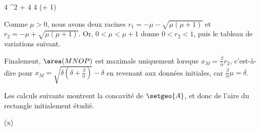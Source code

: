 \smallskip
\begin{stepcalc}[style=sar]
	\Delta
\explnext{}
	4 \mu^2 + 4 \mu
\explnext{}
	4 \mu (\mu + 1)
\end{stepcalc}
\smallskip

Comme $\mu > 0$, nous avons deux racines
$r_1 = - \mu - \sqrt{\mu (\mu + 1)}$
et
$r_2 = - \mu + \sqrt{\mu (\mu + 1)}$.
Or,
$0 < \mu < \mu + 1$
donne
$0 < r_2 < 1$,
puis
le tableau de variations suivant.
%
\begin{center}
\end{center}


Finalement,
$\area(MNOP)$ est maximale uniquement lorsque 
$x_M = \frac{\beta}{\alpha} r_2$,
c'est-à-dire pour %
$x_M = \sqrt{\delta (\delta + \frac{\beta}{\alpha})} - \delta$
en revenant aux données initiales, car $\frac{\beta}{\alpha} \mu = \delta$.




\begin{remark}
	Les calculs suivants montrent la concavité de $\setgeo{A}$, et donc de l'aire du rectangle initialement étudié.

	\smallskip
	\begin{stepcalc}[style=sar]
    	(x)
    \explnext{}
    \explnext{}
    \explnext{}
    \end{stepcalc}
\end{remark}




